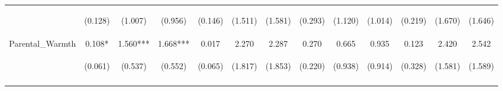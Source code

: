 \begin{tabular}{lcccccccccccc}
 & \begin{footnotesize}(0.128)\end{footnotesize} & \begin{footnotesize}(1.007)\end{footnotesize} & \begin{footnotesize}(0.956)\end{footnotesize} & \begin{footnotesize}(0.146)\end{footnotesize} & \begin{footnotesize}(1.511)\end{footnotesize} & \begin{footnotesize}(1.581)\end{footnotesize} & \begin{footnotesize}(0.293)\end{footnotesize} & \begin{footnotesize}(1.120)\end{footnotesize} & \begin{footnotesize}(1.014)\end{footnotesize} & \begin{footnotesize}(0.219)\end{footnotesize} & \begin{footnotesize}(1.670)\end{footnotesize} & \begin{footnotesize}(1.646)\end{footnotesize}\\
\noalign{\smallskip}Parental_Warmth & 0.108* & 1.560*** & 1.668*** & 0.017 & 2.270 & 2.287 & 0.270 & 0.665 & 0.935 & 0.123 & 2.420 & 2.542\\
 & \begin{footnotesize}(0.061)\end{footnotesize} & \begin{footnotesize}(0.537)\end{footnotesize} & \begin{footnotesize}(0.552)\end{footnotesize} & \begin{footnotesize}(0.065)\end{footnotesize} & \begin{footnotesize}(1.817)\end{footnotesize} & \begin{footnotesize}(1.853)\end{footnotesize} & \begin{footnotesize}(0.220)\end{footnotesize} & \begin{footnotesize}(0.938)\end{footnotesize} & \begin{footnotesize}(0.914)\end{footnotesize} & \begin{footnotesize}(0.328)\end{footnotesize} & \begin{footnotesize}(1.581)\end{footnotesize} & \begin{footnotesize}(1.589)\end{footnotesize}\\
\noalign{\smallskip}\hline\end{tabular}\\
